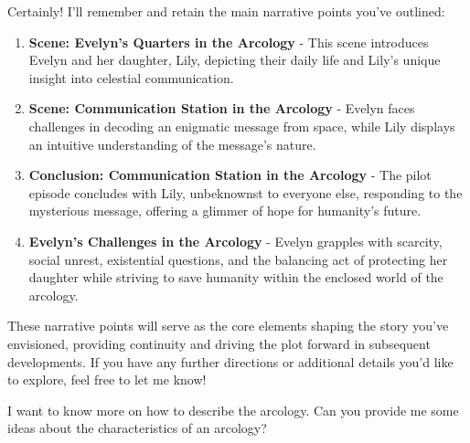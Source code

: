 \begin{aquote}
    Certainly! I'll remember and retain the main narrative points you've outlined:
    \begin{enumerate}
        \item \textbf{Scene: Evelyn's Quarters in the Arcology} - This scene introduces Evelyn and her daughter, Lily, depicting their daily life and Lily's unique insight into celestial communication.
        \item \textbf{Scene: Communication Station in the Arcology} - Evelyn faces challenges in decoding an enigmatic message from space, while Lily displays an intuitive understanding of the message's nature.
        \item \textbf{Conclusion: Communication Station in the Arcology} - The pilot episode concludes with Lily, unbeknownst to everyone else, responding to the mysterious message, offering a glimmer of hope for humanity's future.
        \item \textbf{Evelyn's Challenges in the Arcology} - Evelyn grapples with scarcity, social unrest, existential questions, and the balancing act of protecting her daughter while striving to save humanity within the enclosed world of the arcology.
    \end{enumerate}
    These narrative points will serve as the core elements shaping the story you've envisioned, providing continuity and driving the plot forward in subsequent developments. If you have any further directions or additional details you'd like to explore, feel free to let me know!
\end{aquote}


\begin{qquote}
    I want to know more on how to describe the arcology. Can you provide me some ideas about the characteristics of an arcology?
\end{qquote}

